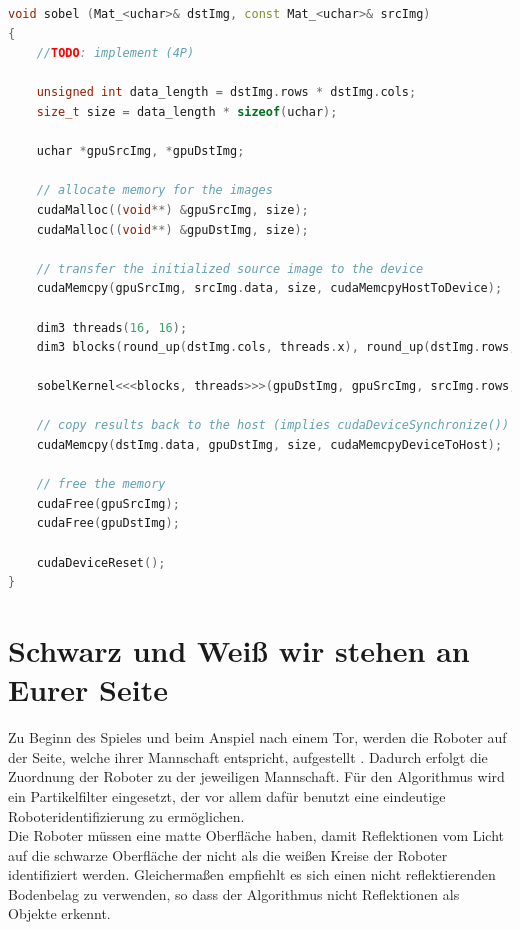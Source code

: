 \documentclass{ezb}
\begin{document}
\begin{lstlisting}[language=C++]
void sobel (Mat_<uchar>& dstImg, const Mat_<uchar>& srcImg)
{
    //TODO: implement (4P)
	
	unsigned int data_length = dstImg.rows * dstImg.cols;
	size_t size = data_length * sizeof(uchar);
	
	uchar *gpuSrcImg, *gpuDstImg;
	
	// allocate memory for the images
	cudaMalloc((void**) &gpuSrcImg, size);
	cudaMalloc((void**) &gpuDstImg, size);
	
	// transfer the initialized source image to the device
	cudaMemcpy(gpuSrcImg, srcImg.data, size, cudaMemcpyHostToDevice);
	
	dim3 threads(16, 16);
	dim3 blocks(round_up(dstImg.cols, threads.x), round_up(dstImg.rows, threads.y));
	
	sobelKernel<<<blocks, threads>>>(gpuDstImg, gpuSrcImg, srcImg.rows, srcImg.cols);
	
	// copy results back to the host (implies cudaDeviceSynchronize())
	cudaMemcpy(dstImg.data, gpuDstImg, size, cudaMemcpyDeviceToHost);
	
	// free the memory
	cudaFree(gpuSrcImg);
	cudaFree(gpuDstImg);
	
	cudaDeviceReset();
}

\end{lstlisting}
\section{Schwarz und Weiß wir stehen an Eurer Seite}
Zu Beginn des Spieles und beim Anspiel nach einem Tor, werden die Roboter auf der Seite, welche ihrer Mannschaft entspricht, aufgestellt . Dadurch erfolgt die Zuordnung der Roboter zu der jeweiligen Mannschaft. Für den Algorithmus wird ein Partikelfilter eingesetzt, der vor allem dafür benutzt eine eindeutige Roboteridentifizierung zu ermöglichen.\\
\linebreak
Die Roboter müssen eine matte Oberfläche haben, damit Reflektionen vom Licht auf die schwarze Oberfläche der nicht als die weißen Kreise der Roboter identifiziert werden. Gleichermaßen empfiehlt es sich einen nicht reflektierenden Bodenbelag zu verwenden, so dass der Algorithmus nicht Reflektionen als Objekte erkennt.
\end{document}
